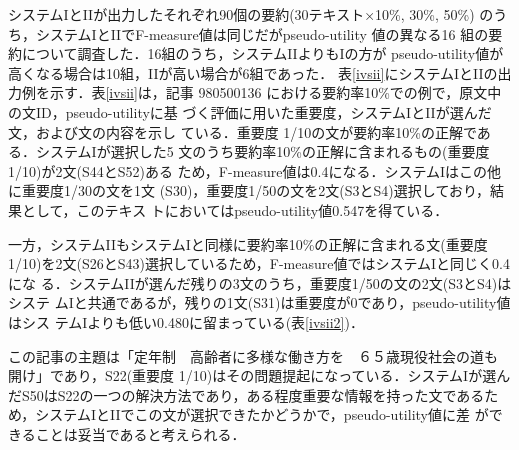システムIとIIが出力したそれぞれ90個の要約(30テキスト×10\%, 30\%, 50\%) 
のうち，システムIとIIでF-measure値は同じだがpseudo-utility 値の異なる16 
組の要約について調査した．16組のうち，システムIIよりもIの方が
pseudo-utility値が高くなる場合は10組，IIが高い場合が6組であった．
表\ref{ivsii}にシステムIとIIの出力例を示す．表\ref{ivsii}は，記事 
980500136 における要約率10\%での例で，原文中の文ID，pseudo-utilityに基
づく評価に用いた重要度，システムIとIIが選んだ文，および文の内容を示し
ている．重要度 1/10の文が要約率10\%の正解である．システムIが選択した5
文のうち要約率10\%の正解に含まれるもの(重要度1/10)が2文(S44とS52)ある
ため，F-measure値は0.4になる．システムIはこの他に重要度1/30の文を1文
(S30)，重要度1/50の文を2文(S3とS4)選択しており，結果として，このテキス
トにおいてはpseudo-utility値0.547を得ている．

一方，システムIIもシステムIと同様に要約率10\%の正解に含まれる文(重要度
1/10)を2文(S26とS43)選択しているため，F-measure値ではシステムIと同じく0.4にな
る．システムIIが選んだ残りの3文のうち，重要度1/50の文の2文(S3とS4)はシステ
ムIと共通であるが，残りの1文(S31)は重要度が0であり，pseudo-utility値はシス
テムIよりも低い0.480に留まっている(表\ref{ivsii2})．

この記事の主題は「定年制　高齢者に多様な働き方を　６５歳現役社会の道も
開け」であり，S22(重要度 1/10)はその問題提起になっている．システムIが選ん
だS50はS22の一つの解決方法であり，ある程度重要な情報を持った文であるた
め，システムIとIIでこの文が選択できたかどうかで，pseudo-utility値に差
ができることは妥当であると考えられる．


